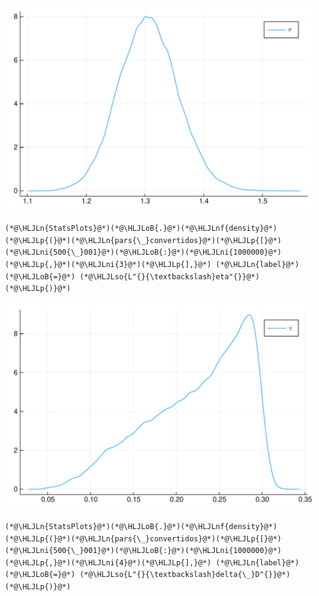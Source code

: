 \documentclass[12pt,a4paper]{article}
\newcommand{\HLJLn}[1]{#1}
\newcommand{\HLJLnf}[1]{\textcolor[RGB]{66,102,213}{#1}}
\newcommand{\HLJLso}[1]{\textcolor[RGB]{201,61,57}{#1}}
\newcommand{\HLJLni}[1]{\textcolor[RGB]{59,151,46}{#1}}
\newcommand{\HLJLoB}[1]{\textcolor[RGB]{102,102,102}{\textbf{#1}}}
\newcommand{\HLJLp}[1]{#1}
\begin{document}
\includegraphics[width=\linewidth]{figures/carlos_mcmc_3_1.pdf}

\begin{lstlisting}
(*@\HLJLn{StatsPlots}@*)(*@\HLJLoB{.}@*)(*@\HLJLnf{density}@*)(*@\HLJLp{(}@*)(*@\HLJLn{pars{\_}convertidos}@*)(*@\HLJLp{[}@*)(*@\HLJLni{500{\_}001}@*)(*@\HLJLoB{:}@*)(*@\HLJLni{1000000}@*)(*@\HLJLp{,}@*)(*@\HLJLni{3}@*)(*@\HLJLp{],}@*) (*@\HLJLn{label}@*)(*@\HLJLoB{=}@*) (*@\HLJLso{L"{}{\textbackslash}eta"{}}@*)(*@\HLJLp{)}@*)
\end{lstlisting}

\includegraphics[width=\linewidth]{figures/carlos_mcmc_4_1.pdf}

\begin{lstlisting}
(*@\HLJLn{StatsPlots}@*)(*@\HLJLoB{.}@*)(*@\HLJLnf{density}@*)(*@\HLJLp{(}@*)(*@\HLJLn{pars{\_}convertidos}@*)(*@\HLJLp{[}@*)(*@\HLJLni{500{\_}001}@*)(*@\HLJLoB{:}@*)(*@\HLJLni{1000000}@*)(*@\HLJLp{,}@*)(*@\HLJLni{4}@*)(*@\HLJLp{],}@*) (*@\HLJLn{label}@*)(*@\HLJLoB{=}@*) (*@\HLJLso{L"{}{\textbackslash}delta{\_}D"{}}@*)(*@\HLJLp{)}@*)
\end{lstlisting}
\end{document}
